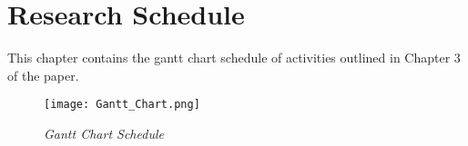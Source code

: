 \chapter{Research Schedule}
\noindent This chapter contains the gantt chart schedule of activities outlined in Chapter 3 of the paper.

\begin{figure}[ht]
    \centering
    \texttt{[image: Gantt\_Chart.png]} %
    \caption{\textit{Gantt Chart Schedule}}
    \label{fig:gantt-chart}
\end{figure}
